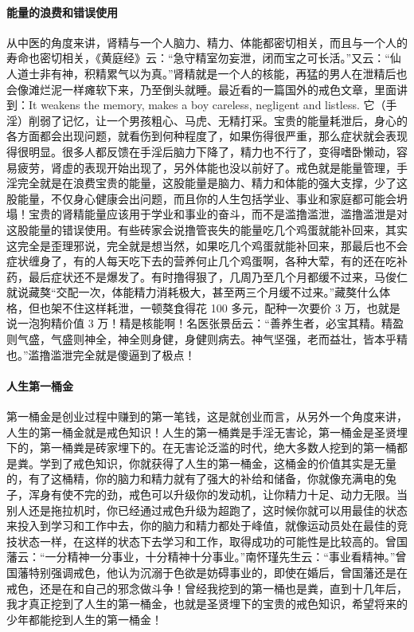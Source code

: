 \paragraph{能量的浪费和错误使用}

从中医的角度来讲，肾精与一个人脑力、精力、体能都密切相关，而且与一个人的寿命也密切相关，《黄庭经》云：“急守精室勿妄泄，闭而宝之可长活。”又云：“仙人道士非有神，积精累气以为真。”肾精就是一个人的核能，再猛的男人在泄精后也会像滩烂泥一样瘫软下来，乃至倒头就睡。最近看的一篇国外的戒色文章，里面讲到：It weakens the memory, makes a boy careless, negligent and listless. 它（手淫）削弱了记忆，让一个男孩粗心、马虎、无精打采。宝贵的能量耗泄后，身心的各方面都会出现问题，就看伤到何种程度了，如果伤得很严重，那么症状就会表现得很明显。很多人都反馈在手淫后脑力下降了，精力也不行了，变得嗜卧懒动，容易疲劳，肾虚的表现开始出现了，另外体能也没以前好了。戒色就是能量管理，手淫完全就是在浪费宝贵的能量，这股能量是脑力、精力和体能的强大支撑，少了这股能量，不仅身心健康会出问题，而且你的人生包括学业、事业和家庭都可能会坍塌！宝贵的肾精能量应该用于学业和事业的奋斗，而不是滥撸滥泄，滥撸滥泄是对这股能量的错误使用。有些砖家会说撸管丧失的能量吃几个鸡蛋就能补回来，其实这完全是歪理邪说，完全就是想当然，如果吃几个鸡蛋就能补回来，那最后也不会症状缠身了，有的人每天吃下去的营养何止几个鸡蛋啊，各种大荤，有的还在吃补药，最后症状还不是爆发了。有时撸得狠了，几周乃至几个月都缓不过来，马俊仁就说藏獒“交配一次，体能精力消耗极大，甚至两三个月缓不过来。”藏獒什么体格，但也架不住这样耗泄，一顿獒食得花 100 多元，配种一次要价 3 万，也就是说一泡狗精价值 3 万！精是核能啊！名医张景岳云：“善养生者，必宝其精。精盈则气盛，气盛则神全，神全则身健，身健则病去。神气坚强，老而益壮，皆本乎精也。”滥撸滥泄完全就是傻逼到了极点！

\paragraph{人生第一桶金}

第一桶金是创业过程中赚到的第一笔钱，这是就创业而言，从另外一个角度来讲，人生的第一桶金就是戒色知识！人生的第一桶粪是手淫无害论，第一桶金是圣贤埋下的，第一桶粪是砖家埋下的。在无害论泛滥的时代，绝大多数人挖到的第一桶都是粪。学到了戒色知识，你就获得了人生的第一桶金，这桶金的价值其实是无量的，有了这桶精，你的脑力和精力就有了强大的补给和储备，你就像充满电的兔子，浑身有使不完的劲，戒色可以升级你的发动机，让你精力十足、动力无限。当别人还是拖拉机时，你已经通过戒色升级为超跑了，这时候你就可以用最佳的状态来投入到学习和工作中去，你的脑力和精力都处于峰值，就像运动员处在最佳的竞技状态一样，在这样的状态下去学习和工作，取得成功的可能性是比较高的。曾国藩云：“一分精神一分事业，十分精神十分事业。”南怀瑾先生云：“事业看精神。”曾国藩特别强调戒色，他认为沉溺于色欲是妨碍事业的，即使在婚后，曾国藩还是在戒色，还是在和自己的邪念做斗争！曾经我挖到的第一桶也是粪，直到十几年后，我才真正挖到了人生的第一桶金，也就是圣贤埋下的宝贵的戒色知识，希望将来的少年都能挖到人生的第一桶金！

